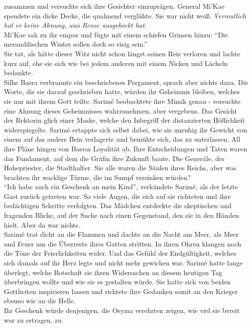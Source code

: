 zusammen und versuchte sich ihre Gesichter einzuprägen. General Mi'Kae spendete ein dicke Decke, 
die qualmend verglühte. Sie war nicht weiß. \textit{Vermutlich hat er keine Ahnung, was Renec 
ausgeheckt hat.}\\
Mi'Kae sah zu ihr empor und fügte mit einem schiefen Grinsen hinzu: ``Die merandilischen Winter 
sollen doch so eisig sein.''\\
Sie tat, als hätte dieser Witz nicht schon längst seinen Reiz verloren und lachte kurz auf, ehe sie 
sich wie bei jedem anderen mit einem Nicken und Lächeln bedankte.\\
Silhe Basra verbrannte ein beschriebenes Pergament, sprach aber nichts dazu. Die Worte, die sie 
darauf geschrieben hatte, würden ihr Geheimnis bleiben, welches sie nur mit ihrem Gott teilte. 
Sarimé beobachtete ihre Mimik genau - versuchte eine Ahnung dieses Geheimnisses wahrzunehmen, aber 
vergebens. Das Gesicht der Rektorin glich einer Maske, welche den Inbegriff der distanzierten 
Höflichkeit widerspiegelte. Sarimé ertappte sich selbst dabei, wie sie unruhig ihr Gewicht von 
einem auf das andere Bein verlagerte und bemühte sich, das zu unterlassen. All ihre Pläne hingen 
von Basras Loyalität ab. Ihre Entscheidungen und Taten waren das Fundament, auf dem die Gräfin ihre 
Zukunft baute. Die Generäle, der Hohepriester, die Stadthalter. Sie alle waren die Säulen ihres 
Reichs, aber was brachten ihr wacklige Türme, die im Sumpf versinken würden?\\
``Ich habe auch ein Geschenk an mein Kind'', verkündete Sarimé, als der letzte Gast zurück getreten 
war. So viele Augen, die sich auf sie richteten und ihre bedächtigen Schritte verfolgten. Das 
Mädchen entdeckte die skeptischen und fragenden Blicke, auf der Suche nach einen Gegenstand, den 
sie in den Händen hielt. Aber da war nichts.\\
Sarimé trat dicht an die Flammen und dachte an die Nacht am Meer, als Meer und Feuer um die 
Überreste ihres Gatten stritten. In ihren Ohren klangen noch die Töne der Feierlichkeiten wider. 
Und das Gefühl der Endgültigkeit, welches sich damals auf ihr Herz legte und nicht mehr gewichen 
war. Sarimé hatte lange überlegt, welche Botschaft sie ihren Widersachen an diesem heutigen Tag 
überbringen wollte und wie sie es gestalten würde. Sie hatte sich von beiden Gottheiten inspirieren 
lassen und richtete ihre Gedanken somit an den Krieger ebenso wie an die Helle.\\
Ihr Geschenk würde denjenigen, die Osyma verehrten zeigen, wie viel sie bereit war zu ertragen, zu 
